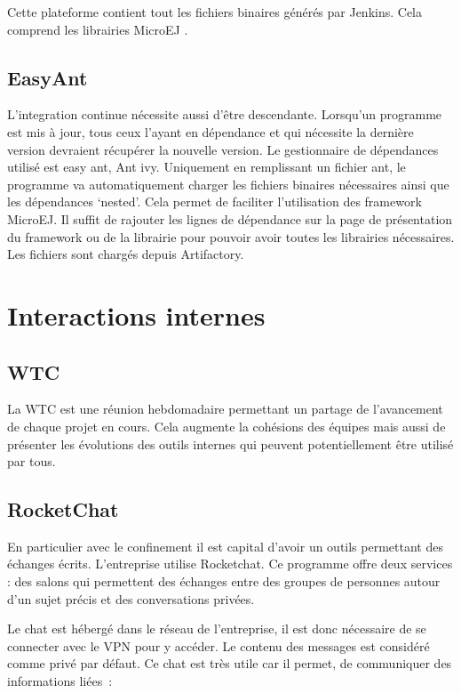 \documentclass[french,a4paper,12pt]{report}
\begin{document}
Cette plateforme contient tout les fichiers binaires générés par Jenkins. Cela comprend les librairies MicroEJ .

\subsection{EasyAnt}
L'integration continue nécessite aussi d'être descendante. Lorsqu'un programme est mis à jour, tous ceux l'ayant en dépendance et qui nécessite la dernière version devraient récupérer la nouvelle version.
Le gestionnaire de dépendances utilisé est easy ant, Ant ivy. Uniquement en remplissant un fichier ant, le programme va automatiquement charger les fichiers binaires nécessaires ainsi que les dépendances ‘nested’. Cela permet de faciliter l’utilisation des framework MicroEJ. Il suffit de rajouter les lignes de dépendance sur la page de présentation du framework ou de la librairie pour pouvoir avoir toutes les librairies nécessaires. Les fichiers sont chargés depuis Artifactory.

\section{Interactions internes}

\subsection{WTC}

La WTC est une réunion hebdomadaire permettant un partage de l’avancement de chaque projet en cours. Cela augmente la cohésions des équipes mais aussi de présenter les évolutions des outils internes qui peuvent potentiellement être utilisé par tous.

\subsection{RocketChat}

En particulier avec le confinement il est capital d’avoir un outils permettant des échanges écrits. L'entreprise utilise Rocketchat. Ce programme offre deux services : des salons qui permettent des échanges entre des groupes de personnes autour d'un sujet précis et des conversations privées.

Le chat est hébergé dans le réseau de l’entreprise, il est donc nécessaire de se connecter avec le VPN pour y accéder. Le contenu des messages est considéré comme privé par défaut.
Ce chat est très utile car il permet, de communiquer des informations liées :
\end{document}
